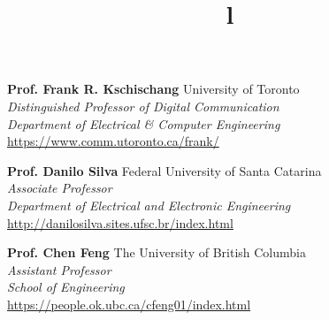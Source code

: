 \documentclass[margin, line]{res}
\begin{document}
\begin{resume}
\textbf{Prof. Frank R. Kschischang} \hfill University of Toronto\\
{\sl Distinguished Professor of Digital Communication}\\
{\sl Department of Electrical \& Computer Engineering}\\
\url{https://www.comm.utoronto.ca/frank/}

\textbf{Prof. Danilo Silva} \hfill Federal University of Santa Catarina\\
{\sl Associate Professor}\\
{\sl Department of Electrical and Electronic Engineering}\\
\url{http://danilosilva.sites.ufsc.br/index.html}

\textbf{Prof. Chen Feng} \hfill The University of British Columbia\\
{\sl Assistant Professor}\\
{\sl School of Engineering}\\
\url{https://people.ok.ubc.ca/cfeng01/index.html}


\begin{format}
\title{l}\\
\\
\body\\
\end{format}

\end{resume}
\(\)
\end{document}
